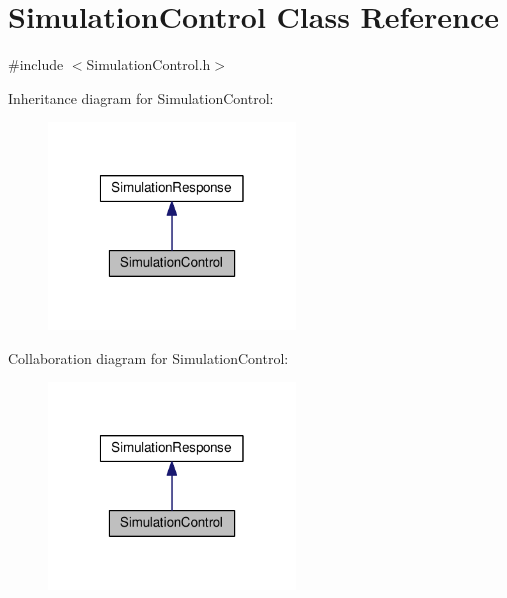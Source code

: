 \hypertarget{class_simulation_control}{\section{Simulation\-Control Class Reference}
\label{class_simulation_control}
}


{\ttfamily \#include $<$Simulation\-Control.\-h$>$}



Inheritance diagram for Simulation\-Control\-:
\nopagebreak
\begin{figure}[H]
\begin{center}
\leavevmode
\includegraphics[width=186pt]{class_simulation_control__inherit__graph}
\end{center}
\end{figure}


Collaboration diagram for Simulation\-Control\-:
\nopagebreak
\begin{figure}[H]
\begin{center}
\leavevmode
\includegraphics[width=186pt]{class_simulation_control__coll__graph}
\end{center}
\end{figure}
